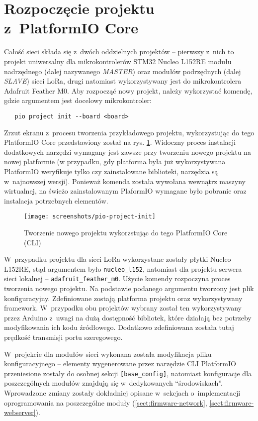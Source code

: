 \section{Rozpoczęcie projektu z~PlatformIO Core\label{sect:pio-intro}} Całość sieci składa się z~dwóch oddzielnych
projektów -- pierwszy z~nich to projekt uniwersalny dla mikrokontrolerów STM32 Nucleo L152RE modułu nadrzędnego (dalej
nazywanego \textsl{MASTER}) oraz modułów podrzędnych (dalej \textsl{SLAVE}) sieci LoRa, drugi natomiast wykorzystywany
jest do mikrokontrolera Adafruit Feather M0. Aby rozpocząć nowy projekt, należy wykorzystać komendę, gdzie argumentem
jest docelowy mikrokontroler:
\begin{verbatim}
   pio project init --board <board>
\end{verbatim}
Zrzut ekranu z~procesu tworzenia przykładowego projektu, wykorzystując do tego PlatformIO Core przedstawiony został na
rys. \ref{img:pio-project-init}. Widoczny proces instalacji dodatkowych narzędzi wymagany jest zawsze przy tworzeniu
nowego projektu na nowej platformie (w przypadku, gdy platforma była już wykorzystywana PlatformIO weryfikuje tylko czy
zainstalowane biblioteki, narzędzia są w~najnowszej wersji). Ponieważ komenda została wywołana wewnątrz maszyny
wirtualnej, na świeżo zainstalowanym PlaformIO wymagane było pobranie oraz instalacja potrzebnych elementów.

\begin{figure}[!htbp]
    \centering
    \texttt{[image: screenshots/pio-project-init]}
    \caption{\label{img:pio-project-init}Tworzenie nowego projektu wykorzstując do tego PlatformIO Core (CLI)}
\end{figure}

W~przypadku projektu dla sieci LoRa wykorzystane zostały płytki Nucleo L152RE, stąd argumentem było
\texttt{nucleo\_l152}, natomiast dla projektu serwera sieci lokalnej -- \texttt{adafruit\_feather\_m0}. Użycie komendy
rozpoczyna proces tworzenia nowego projektu. Na podstawie podanego argumentu tworzony jest plik konfiguracyjny.
Zdefiniowane zostają platforma projektu oraz wykorzystywany framework. W~przypadku obu projektów wybrany został ten
wykorzystywany przez Arduino z~uwagi na dużą dostępność bibliotek, które działają bez potrzeby modyfikowania ich kodu
źródłowego. Dodatkowo zdefiniowana została tutaj prędkość transmisji portu szeregowego.

W~projekcie dla modułów sieci wykonana została modyfikacja pliku konfiguracyjnego -- elementy wygenerowane przez
narzędzie CLI PlatformIO przeniesione zostały do osobnej sekcji \texttt{[base\_config]}, natomiast konfiguracje dla
poszczególnych modułów znajdują się w~dedykowanych \enquote{środowiskach}. Wprowadzone zmiany zostały dokładniej opisane
w~sekcjach o~implementacji oprogramowania na poszczególne moduły (\ref{sect:firmware-network},
\ref{sect:firmware-webserver}).


